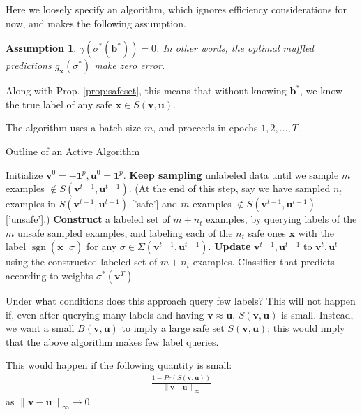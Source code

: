 \documentclass{article}
\newcommand{\vx}{\mathbf{x}}
\newcommand{\vb}{\mathbf{b}}
\newcommand{\vu}{\mathbf{u}}
\newcommand{\vv}{\mathbf{v}}
\newcommand{\vone}{\mathbf{1}}
\DeclareMathOperator{\sgn}{sgn}
\newtheorem{ass}{Assumption}
\newcommand{\vnorm}[1]{\left\lVert#1\right\rVert} %
\newcommand{\lrsetb}[1]{\left\{#1\right\}}
\begin{document}
Here we loosely specify an algorithm, which ignores efficiency considerations for now, 
and makes the following assumption. 
\begin{ass}
$\gamma (\sigma^* (\vb^*)) = 0$. In other words, the optimal muffled predictions $g_{\vx} (\sigma^*)$ make zero error.
\end{ass}
Along with Prop. \ref{prop:safeset}, this means that without knowing $\vb^*$, we know the true label of any safe $\vx \in S (\vv, \vu)$. 


The algorithm uses a batch size $m$, and proceeds in epochs $1, 2, \dots, T$. 

\begin{algorithm}[]
   \caption{Outline of an Active Algorithm}
   \label{alg:activealg}
\begin{algorithmic}
   \STATE Initialize $\vv^{0} = - \vone^p, \vu^{0} = \vone^p$. 
   \STATE \textbf{Keep sampling} unlabeled data until we sample $m$ examples $\notin S (\vv^{t-1}, \vu^{t-1})$. 
   (At the end of this step, say we have sampled $n_t$ examples in $S (\vv^{t-1}, \vu^{t-1})$ ['safe']
   and $m$ examples $\notin S (\vv^{t-1}, \vu^{t-1})$ ['unsafe'].)
   \STATE \textbf{Construct} a labeled set of $m + n_t$ examples, by querying labels of the $m$ unsafe sampled examples, 
   and labeling each of the $n_t$ safe ones $\vx$ with the label $\sgn (\vx^\top \sigma)$ for any $\sigma \in \Sigma (\vv^{t-1}, \vu^{t-1})$.
   \STATE \textbf{Update} $\vv^{t-1}, \vu^{t-1}$ to $\vv^{t}, \vu^{t}$ using the constructed labeled set of $m + n_t$ examples. 
   \ENDFOR
    Classifier that predicts according to weights $\sigma^* (\vv^{T})$
\end{algorithmic}
\end{algorithm}

Under what conditions does this approach query few labels? 
This will not happen if, even after querying many labels and having $\vv \approx \vu$, 
$S (\vv, \vu)$ is small.
Instead, we want a small $B (\vv, \vu)$ to imply a large safe set $S (\vv, \vu)$; this would imply 
that the above algorithm makes few label queries. 

This would happen if the following quantity is small:
\begin{align*}
\frac{ 1 - Pr (S (\vv, \vu)) }{ \vnorm{\vv - \vu}_{\infty} }
\end{align*}
as $\vnorm{\vv - \vu}_{\infty} \to 0$. 
\end{document}
